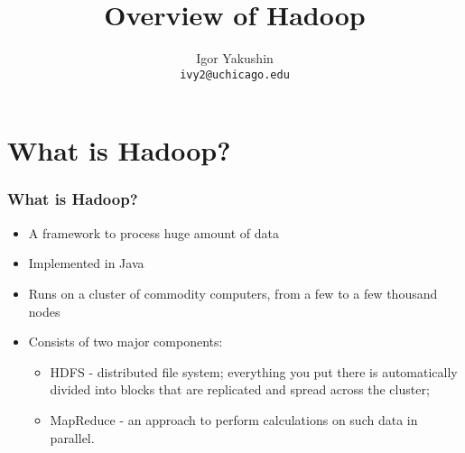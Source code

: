 \documentclass{beamer}
\title{\huge{Overview of Hadoop}}
\author{Igor Yakushin \\ \texttt{ivy2@uchicago.edu}}
\date{}
\begin{document}



\begin{frame}
\titlepage
\end{frame}


\section{What is Hadoop?}
\begin{frame}
  \frametitle{What is Hadoop?}
  \begin{itemize}
   \item A framework to process huge amount of data
   \item Implemented in Java
   \item Runs on a cluster of commodity computers, from a few to a few thousand nodes
   \item Consists of two major components:
    \begin{itemize}
      \item {\color{mycolordef}HDFS} - distributed file system; everything you put there is automatically divided into blocks that are replicated and spread across the cluster;
      \item {\color{mycolordef}MapReduce} - an approach to perform calculations on such data in parallel.
    \end{itemize}
  \end{itemize}
\end{frame}
\end{document}
